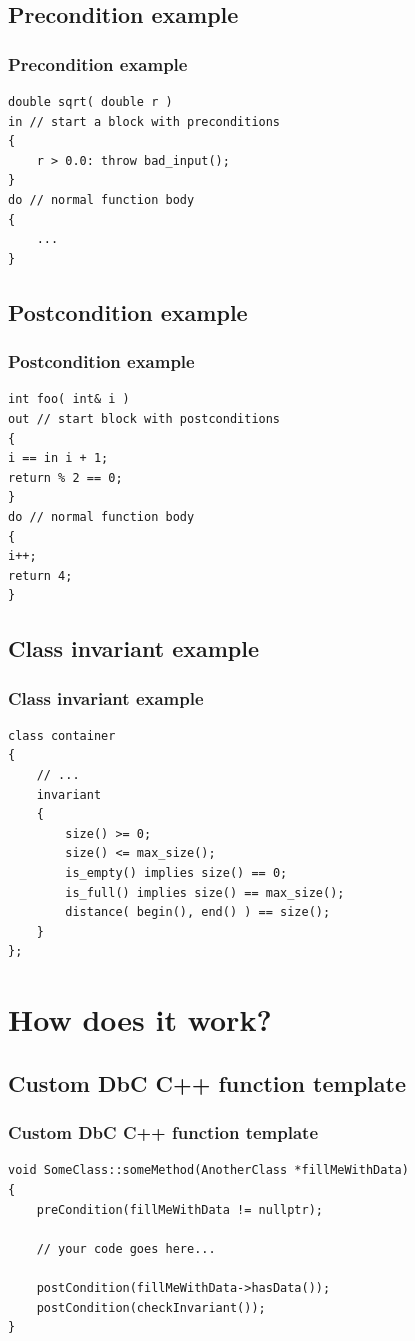 \documentclass{beamer}
\begin{document}
\subsection{Precondition example}
\begin{frame}[fragile]
\frametitle{Precondition example}
\begin{lstlisting}[caption=http://www.open-std.org/jtc1/sc22/wg21/docs/papers/2004/n1613.pdf]
double sqrt( double r )
in // start a block with preconditions
{
    r > 0.0: throw bad_input();
}
do // normal function body
{
    ...
}
\end{lstlisting}
\end{frame}

\subsection{Postcondition example}
\begin{frame}[fragile]
\frametitle{Postcondition example}
\begin{lstlisting}[caption=http://www.open-std.org/jtc1/sc22/wg21/docs/papers/2004/n1613.pdf]
int foo( int& i )
out // start block with postconditions
{
i == in i + 1;
return % 2 == 0;
}
do // normal function body
{
i++;
return 4;
}
\end{lstlisting}
\end{frame}

\subsection{Class invariant example}
\begin{frame}[fragile]
\frametitle{Class invariant example}
\begin{lstlisting}[caption=http://www.open-std.org/jtc1/sc22/wg21/docs/papers/2004/n1613.pdf]
class container
{
    // ...
    invariant
    {
        size() >= 0;
        size() <= max_size();
        is_empty() implies size() == 0;
        is_full() implies size() == max_size();
        distance( begin(), end() ) == size();
    }
};
\end{lstlisting}
\end{frame}


\section{How does it work?}
\subsection{Custom DbC C++ function template}
\begin{frame}[fragile]
\frametitle{Custom DbC C++ function template}
\begin{lstlisting}
void SomeClass::someMethod(AnotherClass *fillMeWithData)
{
    preCondition(fillMeWithData != nullptr);

    // your code goes here...

    postCondition(fillMeWithData->hasData());
    postCondition(checkInvariant());
}
\end{lstlisting}
\end{frame}
\end{document}
